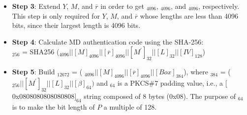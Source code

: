 \documentclass[main\_\_EN.tex]{subfiles}
\begin{document}
\begin{itemize}
    \item {\bfseries Step 3}: Extend \begin{math}Y\end{math}, \begin{math}M\end{math}, and \begin{math}\overline{r}\end{math} in order to get \begin{math}[Y]_{4096}\end{math}, \begin{math}[M]_{4096}\end{math}, and \begin{math}[\overline{r}]_{4096}\end{math}, respectively. This step is only required for \begin{math}Y\end{math}, \begin{math}M\end{math}, and \begin{math}\overline{r}\end{math} whose lengths are less than 4096 bits, since their largest length is 4096 bits.


    \item {\bfseries Step 4}: Calculate MD authentication code using the SHA-256:\\
                \begin{math}[MD]_{256}\end{math} = SHA256 (\begin{math}
                [Y]_{4096} ||
                [M]_{4096} ||
                [\overline{r}]_{4096} ||
                [M^{\prime}]_{32} ||
                [L]_{32} ||
                [IV]_{128}
            \end{math})

    \item {\bfseries Step 5}: Build \begin{math}[P]_{12672}\end{math} = (
            \begin{math}
                [Y]_{4096} ||
                [M]_{4096} ||
                [\overline{r}]_{4096} ||
                [Box]_{384}
            \end{math}), where
            \begin{math}[Box]_{384}\end{math} = (
            \begin{math}
                [MD]_{256} ||
                [M^{\prime}]_{32} ||
                [L]_{32} ||
                [\beta]_{64})
            \end{math} and
            \begin{math}[\beta]_{64} \end{math} is a PKCS\#7 padding value, i.e., a $[$0x0808080808080808$]_{64}$ string composed of 8 bytes (0x08). The purpose of \begin{math}[\beta]_{64}\end{math} is to make the bit length of \begin{math}P\end{math} a multiple of 128.


\end{itemize}
\end{document}
